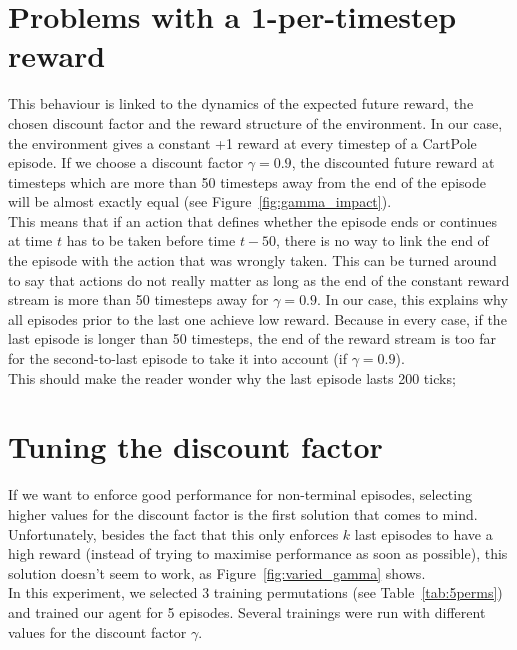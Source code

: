 \section{Problems with a 1-per-timestep reward}
This behaviour is linked to the dynamics of the expected future reward, 
the chosen discount factor and the reward structure of the environment.
In our case, the environment gives a constant +1 reward at every timestep of
a CartPole episode. If we choose a discount factor $\gamma=0.9$, the
discounted future reward at timesteps which are more than 50 timesteps away
from the end of the episode will be almost exactly equal (see 
Figure~\ref{fig:gamma_impact}).\\

This means that if an action that defines whether the episode ends or continues
at time $t$ has to be taken before time $t-50$, there is no way to link the
end of the episode with the action that was wrongly taken. This can be turned
around to say that actions do not really matter as long as the end of the
constant reward stream is more than 50 timesteps away for $\gamma=0.9$. In
our case, this explains why all episodes prior to the last one achieve low
reward. Because in every case, if the last episode is longer than 50
timesteps, the end of the reward stream is too far for the second-to-last 
episode to take it into account (if $\gamma=0.9$).\\

This should make the reader wonder why the last episode lasts 200 ticks;



\section{Tuning the discount factor}
If we want to enforce good performance for non-terminal episodes, selecting
higher values for the discount factor is the first solution that comes to mind.
Unfortunately, besides the fact that this only enforces $k$ last episodes
to have a high reward (instead of trying to maximise performance as soon as
possible), this solution doesn't seem to work, as Figure~\ref{fig:varied_gamma}
shows.\\

In this experiment, we selected 3 training permutations (see 
Table~\ref{tab:5perms}) and trained our agent for 5 episodes. Several trainings
were run with different values for the discount factor $\gamma$.\\

